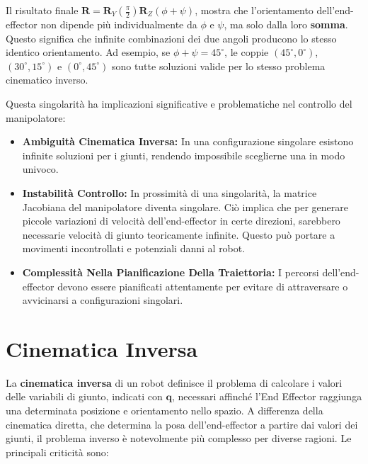 \documentclass[11pt, a4paper]{report}
\begin{document}
Il risultato finale \(\mathbf{R} = \mathbf{R}_{Y}(\frac{\pi}{2}) \mathbf{R}_{Z}(\phi + \psi)\), mostra che l'orientamento dell'end-effector non dipende più individualmente da \(\phi\) e \(\psi\), ma solo dalla loro \textbf{somma}. Questo significa che infinite combinazioni dei due angoli producono lo stesso identico orientamento. Ad esempio, se \(\phi + \psi = 45^\circ\), le coppie \((45^\circ, 0^\circ)\), \((30^\circ, 15^\circ)\) e \((0^\circ, 45^\circ)\) sono tutte soluzioni valide per lo stesso problema cinematico inverso.

Questa singolarità ha implicazioni significative e problematiche nel controllo del manipolatore:
\begin{itemize}
    \item \textbf{Ambiguità Cinematica Inversa:} In una configurazione singolare esistono infinite soluzioni per i giunti, rendendo impossibile sceglierne una in modo univoco.

    \item \textbf{Instabilità Controllo:} In prossimità di una singolarità, la matrice Jacobiana del manipolatore diventa singolare. Ciò implica che per generare piccole variazioni di velocità dell'end-effector in certe direzioni, sarebbero necessarie velocità di giunto teoricamente infinite. Questo può portare a movimenti incontrollati e potenziali danni al robot.

    \item \textbf{Complessità Nella Pianificazione Della Traiettoria:} I percorsi dell'end-effector devono essere pianificati attentamente per evitare di attraversare o avvicinarsi a configurazioni singolari.
\end{itemize}

\newpage
\section{Cinematica Inversa}
La \textbf{cinematica inversa} di un robot definisce il problema di calcolare i valori delle variabili di giunto, indicati con \( \mathbf{q} \), necessari affinché l'End Effector raggiunga una determinata posizione e orientamento nello spazio. A differenza della cinematica diretta, che determina la posa dell'end-effector a partire dai valori dei giunti, il problema inverso è notevolmente più complesso per diverse ragioni. Le principali criticità sono:
\end{document}
